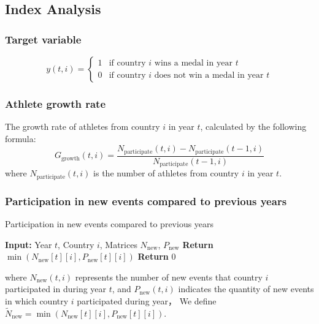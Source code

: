 \documentclass{mcmthesis}
\begin{document}
	
	\subsection{Index Analysis}
	
	
	\subsubsection{Target variable}
	\[
	y(t,i) = 
	\begin{cases} 
		1 & \text{if country } i \text{ wins a medal in year } t \\ 
		0 & \text{if country } i \text{ does not win a medal in year } t 
	\end{cases}
	\]
	\subsubsection{Athlete growth rate}
	The growth rate of athletes from country $i$ in year $t$, calculated by the following formula:
	\[
	G_{\text{growth}}(t,i) = \frac{N_{\text{participate}}(t,i) - N_{\text{participate}}(t-1,i)}{N_{\text{participate}}(t-1,i)}
	\]
	where $N_{\text{participate}}(t,i)$ is the number of athletes from country $i$ in year $t$.
	
	
	\subsubsection{Participation in new events compared to previous years} 
	\begin{algorithm}
		\caption{Participation in new events compared to previous years}
		\begin{algorithmic}[1]
			\State \textbf{Input:} Year \( t \), Country \( i \), Matrices \( N_{\text{new}} \), \( P_{\text{new}} \)
			\State \textbf{Return} $\min(N_{\text{new}}[t][i], P_{\text{new}}[t][i])$
			\EndIf
			\EndFor
			\State \textbf{Return} 0
		\end{algorithmic}
	\end{algorithm}
	
	where \( N_{\text{new}}(t,i) \) represents the number of new events that country \( i \) participated in during year \( t \), and \( P_{\text{new}}(t,i) \) indicates the quantity of new events in which country \(i\) participated during year， We define \( \tilde{N}_{\text{new}} = \min(N_{\text{new}}[t][i], P_{\text{new}}[t][i]) \).
	
\end{document}
